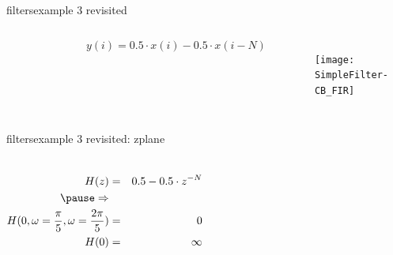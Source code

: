 	\begin{frame}{filters}{example 3 revisited}
        \vspace{-5mm}
        \begin{columns}
	        \begin{figure}
				\begin{center}
                
				\end{center}
	        \end{figure}
        
            \begin{equation*}
        		y(i) = 0.5\cdot x(i) - 0.5\cdot x(i-N)
        	\end{equation*}
            \begin{figure}
                \centerline{\texttt{[image: SimpleFilter-CB\_FIR]}}
            \end{figure}
        \end{columns}
	\end{frame}	
	
	
	\begin{frame}{filters}{example 3 revisited: zplane}
        \vspace{-5mm}
        \begin{columns}
            \begin{eqnarray*}
                H(z) &=& 0.5  - 0.5\cdot z^{-N}\\
               \bigskip
                \pause
            \Rightarrow&&\\
            H(0, \omega = \frac{\pi}{5}, \omega = \frac{2\pi}{5}) &=& 0\\
            H(0) &=& \infty
            \end{eqnarray*}
        \end{columns}
	\end{frame}	
    
